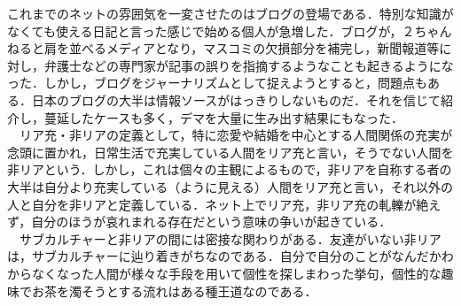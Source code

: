 \documentclass[uplatex,twocolumn,dvipdfmx]{jsarticle}
\begin{document}
これまでのネットの雰囲気を一変させたのはブログの登場である．特別な知識がなくても使える日記と言った感じで始める個人が急増した．ブログが，２ちゃんねると肩を並べるメディアとなり，マスコミの欠損部分を補完し，新聞報道等に対し，弁護士などの専門家が記事の誤りを指摘するようなことも起きるようになった．しかし，ブログをジャーナリズムとして捉えようとすると，問題点もある．日本のブログの大半は情報ソースがはっきりしないものだ．それを信じて紹介し，蔓延したケースも多く，デマを大量に生み出す結果にもなった．\\
　リア充・非リアの定義として，特に恋愛や結婚を中心とする人間関係の充実が念頭に置かれ，日常生活で充実している人間をリア充と言い，そうでない人間を非リアという．しかし，これは個々の主観によるもので，非リアを自称する者の大半は自分より充実している（ように見える）人間をリア充と言い，それ以外の人と自分を非リアと定義している．ネット上でリア充，非リア充の軋轢が絶えず，自分のほうが哀れまれる存在だという意味の争いが起きている．\\
　サブカルチャーと非リアの間には密接な関わりがある．友達がいない非リアは，サブカルチャーに辿り着きがちなのである．自分で自分のことがなんだかわからなくなった人間が様々な手段を用いて個性を探しまわった挙句，個性的な趣味でお茶を濁そうとする流れはある種王道なのである．



\end{document}
